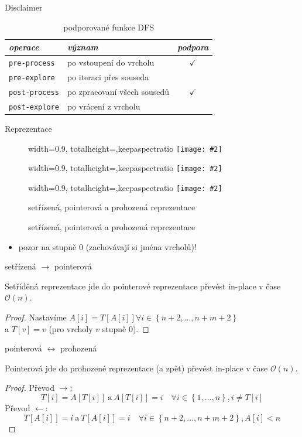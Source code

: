 \documentclass[czech]{beamer}
\makeatletter
\newcommand{\fitimage}[2][\@nil]{
	\begin{figure}
		\begin{adjustbox}{width=0.9\textwidth, totalheight=\textheight-2\baselineskip-2\baselineskip,keepaspectratio}
			\texttt{[image: \#2]}
		\end{adjustbox}
		\def\tmp{#1}%
	 \ifx\tmp\@nnil
			\else
			\caption{#1}
		\fi
	\end{figure}
}
\makeatother
\begin{document}
	\begin{frame}{Disclaimer}
		\begin{table}
			\centering
			\begin{tabular}{llc}
				\toprule
				\emph{operace} & \emph{význam} & \emph{podpora} \\
				\midrule
				\texttt{pre-process} & po vstoupení do vrcholu & $\checkmark$ \\
				\texttt{pre-explore} & po iteraci přes souseda &  \\
				\texttt{post-process} & po zpracovaní všech sousedů & $\checkmark$ \\
				\texttt{post-explore} & po vrácení z vrcholu &  \\
				\bottomrule
			\end{tabular}
			\caption{podporované funkce DFS}
		\end{table}
	\end{frame}

	\begin{frame}{Reprezentace}
		\fitimage{images/sorted.png}
		\fitimage{images/pointer.png}
		\fitimage[setřízená, pointerová a prohozená reprezentace]{images/swapped.png}
		\begin{itemize}
			\item pozor na stupně $0$ (zachovávají si jména vrcholů)!
		\end{itemize}
	\end{frame}

	\begin{frame}{setřízená $\rightarrow$ pointerová}
		\begin{lemma}
			Setříděná reprezentace jde do pointerové reprezentace převést in-place v čase $\mathcal{O}\left(n\right)$.
		\end{lemma}

		\begin{proof}
			Nastavíme $A[i] = T\left[A\left[i\right]\right] \forall i \in \left\{n + 2, \ldots, n + m + 2\right\}$ \\
			a $T\left[v\right] = v$ (pro vrcholy $v$ stupně $0$).
		\end{proof}
	\end{frame}

	\begin{frame}{pointerová $\longleftrightarrow$ prohozená}
		\begin{lemma}
			Pointerová jde do prohozené reprezentace (a zpět) převést in-place v čase $\mathcal{O}\left(n\right)$.
		\end{lemma}

		\begin{proof}
			Převod $\rightarrow$: $$T[i] = A[T[i]]\ \text{a}\ A[T[i]] = i\quad \forall i \in \left\{1, \ldots, n\right\}, i \neq T[i]$$
			Převod $\leftarrow$: $$T[A[i]] = i\ \text{a}\ T[A[i]] = i \quad \forall i \in \left\{n + 2, \ldots, n + m + 2\right\}, A[i] < n$$
		\end{proof}
	\end{frame}
\end{document}
